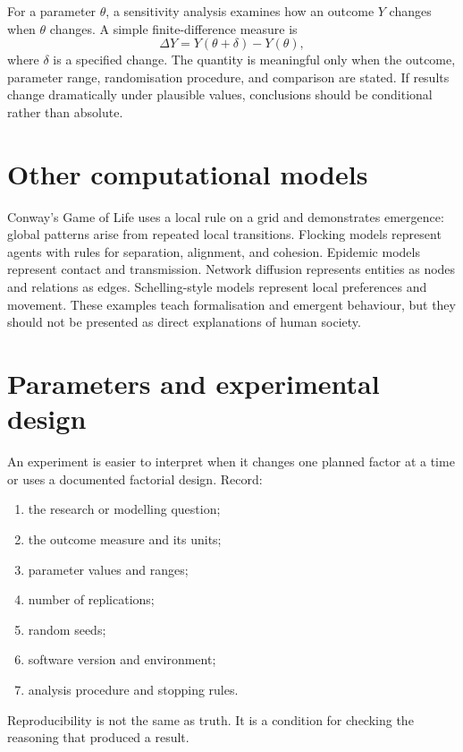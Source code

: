 For a parameter $\theta$, a sensitivity analysis examines how an outcome $Y$ changes when $\theta$ changes. A simple finite-difference measure is
\[
\Delta Y = Y(\theta+\delta)-Y(\theta),
\]
where $\delta$ is a specified change. The quantity is meaningful only when the outcome, parameter range, randomisation procedure, and comparison are stated. If results change dramatically under plausible values, conclusions should be conditional rather than absolute.


\section{Other computational models}
Conway's Game of Life uses a local rule on a grid and demonstrates emergence: global patterns arise from repeated local transitions. Flocking models represent agents with rules for separation, alignment, and cohesion. Epidemic models represent contact and transmission. Network diffusion represents entities as nodes and relations as edges. Schelling-style models represent local preferences and movement. These examples teach formalisation and emergent behaviour, but they should not be presented as direct explanations of human society.

\section{Parameters and experimental design}
An experiment is easier to interpret when it changes one planned factor at a time or uses a documented factorial design. Record:
\begin{enumerate}
\item the research or modelling question;
\item the outcome measure and its units;
\item parameter values and ranges;
\item number of replications;
\item random seeds;
\item software version and environment;
\item analysis procedure and stopping rules.
\end{enumerate}
Reproducibility is not the same as truth. It is a condition for checking the reasoning that produced a result.

